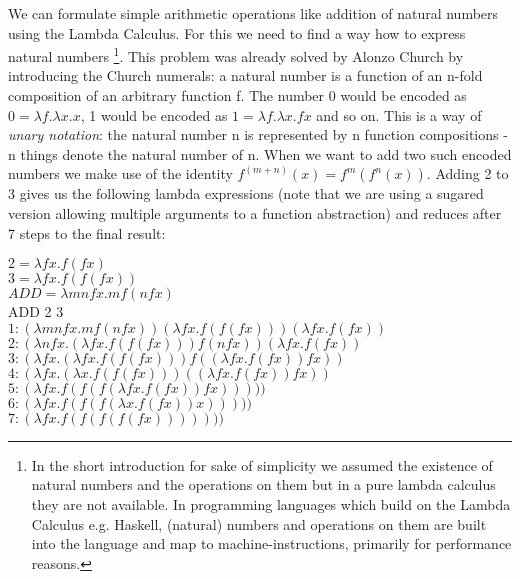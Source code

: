 We can formulate simple arithmetic operations like addition of natural numbers using the Lambda Calculus. For this we need to find a way how to express natural numbers \footnote{In the short introduction for sake of simplicity we assumed the existence of natural numbers and the operations on them but in a pure lambda calculus they are not available. In programming languages which build on the Lambda Calculus e.g. Haskell, (natural) numbers and operations on them are built into the language and map to machine-instructions, primarily for performance reasons.}. This problem was already solved by Alonzo Church by introducing the Church numerals: a natural number is a function of an n-fold composition of an arbitrary function f. The number 0 would be encoded as $0 = \lambda f . \lambda x.x$, 1 would be encoded as $1 = \lambda f . \lambda x . f x$ and so on. This is a way of \textit{unary notation}: the natural number n is represented by n function compositions - n things denote the natural number of n.
When we want to add two such encoded numbers we make use of the identity $f^{(m+n)}(x) = f^m(f^n(x))$. Adding 2 to 3 gives us the following lambda expressions (note that we are using a sugared version allowing multiple arguments to a function abstraction) and reduces after 7 steps to the final result:

\medskip

$2 = \lambda f x . f(f x)$ \\
$3 = \lambda f x . f(f(f x))$ \\
$ADD = \lambda m n f x . m f (n f x)$ \\

ADD 2 3 \\
$1: (\lambda m n f x. m f (n f x)) (\lambda f x.f(f(f x))) (\lambda f x.f(f x))$ \\
$2:  (\lambda n f x. (\lambda f x.f(f(f x))) f (n f x))   (\lambda f x.f(f x))$ \\
$3:     (\lambda f x. (\lambda f x.f(f(f x))) f ((\lambda f x.f(f x)) f x)) $ \\ 
$4:     (\lambda f x.   (\lambda x.f(f(f x)))   ((\lambda f x.f(f x)) f x)) $ \\
$5:     (\lambda f x.       f(f(f(\lambda f x.f(f x)) f x)))))$ \\
$6:     (\lambda f x.       f(f(f  (\lambda x.f(f x)) x)))))$ \\
$7:     (\lambda f x.       f(f(f     (f(f x))  )))))$

